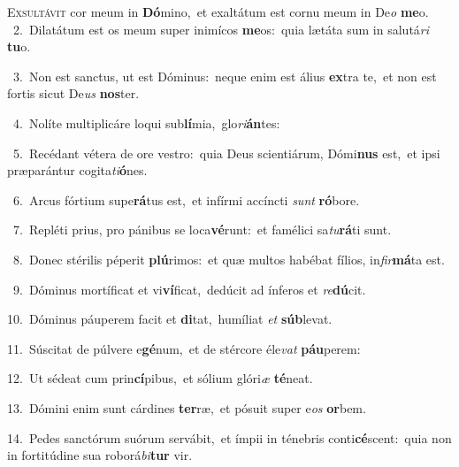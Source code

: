 \lettrine{\initial\textcolor{\initialcolor}{E}}{xsultávit} cor meum in \textbf{Dó}\-mino,~\star et exaltátum est cornu meum in De\textit{o} \textbf{me}\-o.\\
{\numbfont\textcolor{\numbcolor}{~2.}}~Dilatátum est os meum super inimícos \textbf{me}\-os:~\star quia lætáta sum in salutá\textit{ri} \textbf{tu}\-o.\par
{\numbfont\textcolor{\numbcolor}{~3.}}~Non est sanctus, ut est Dóminus:~\dagger neque enim est álius \textbf{ex}\-tra te,~\star et non est fortis sicut De\textit{us} \textbf{nos}\-ter.\par
{\numbfont\textcolor{\numbcolor}{~4.}}~Nolíte multiplicáre loqui sub\-\textbf{lí}\-mia,~\star glo\-\textit{ri}\-\textbf{án}tes:\par
{\numbfont\textcolor{\numbcolor}{~5.}}~Recédant vétera de ore vestro:~\dagger quia Deus scientiárum, Dómi\textbf{nus} est,~\star et ipsi præparántur cogita\-\textit{ti}\-\textbf{ó}nes.\par
{\numbfont\textcolor{\numbcolor}{~6.}}~Arcus fórtium supe\-\textbf{rá}\-tus est,~\star et infírmi accíncti \textit{sunt} \textbf{ró}\-bore.\par
{\numbfont\textcolor{\numbcolor}{~7.}}~Repléti prius, pro pánibus se loca\-\textbf{vé}\-runt:~\star et famélici sa\-\textit{tu}\-\textbf{rá}ti sunt.\par
{\numbfont\textcolor{\numbcolor}{~8.}}~Donec stérilis péperit \textbf{plú}\-rimos:~\star et quæ multos habébat fílios, in\-\textit{fir}\-\textbf{má}ta est.\par
{\numbfont\textcolor{\numbcolor}{~9.}}~Dóminus mortíficat et vi\-\textbf{ví}\-ficat,~\star dedúcit ad ínferos et \textit{re}\-\textbf{dú}cit.\par
{\numbfont\textcolor{\numbcolor}{10.}}~Dóminus páuperem facit et \textbf{di}\-tat,~\star humíliat \textit{et} \textbf{súb}\-levat.\par
{\numbfont\textcolor{\numbcolor}{11.}}~Súscitat de púlvere e\-\textbf{gé}\-num,~\star et de stércore éle\textit{vat} \textbf{páu}\-perem:\par
{\numbfont\textcolor{\numbcolor}{12.}}~Ut sédeat cum prin\-\textbf{cí}\-pibus,~\star et sólium glóri\textit{æ} \textbf{té}\-neat.\par
{\numbfont\textcolor{\numbcolor}{13.}}~Dómini enim sunt cárdines \textbf{ter}\-ræ,~\star et pósuit super e\textit{os} \textbf{or}\-bem.\par
{\numbfont\textcolor{\numbcolor}{14.}}~Pedes sanctórum suórum servábit,~\dagger et ímpii in ténebris conti\-\textbf{cé}\-scent:~\star quia non in fortitúdine sua roborá\-\textit{bi}\-\textbf{tur} vir.\par
